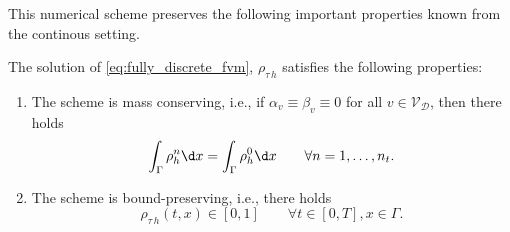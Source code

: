 This numerical scheme preserves the following important properties known from the continous setting.
\begin{theorem}
    The solution of \eqref{eq:fully_discrete_fvm}, $\rho_{\tau\,h}$ satisfies the following
    properties:
    \begin{enumerate}[label=\roman*)]
        \item The scheme is mass conserving, i.e., if $\alpha_v\equiv \beta_v\equiv 0$ for all $v\in \mathcal{V}_{\mathcal{D}}$,
        then there holds
        \begin{equation*}
            \int_\Gamma\rho_h^n\d x = \int_\Gamma\rho_h^0\d x\qquad\forall n=1,\ldots,n_t.
        \end{equation*}
        \item The scheme is bound-preserving, i.e., there holds
        \begin{equation*}
            \rho_{\tau\,h}(t,x)\in [0,1]\qquad \forall t\in [0,T],
            x\in \Gamma.
        \end{equation*}
    \end{enumerate}
\end{theorem}

